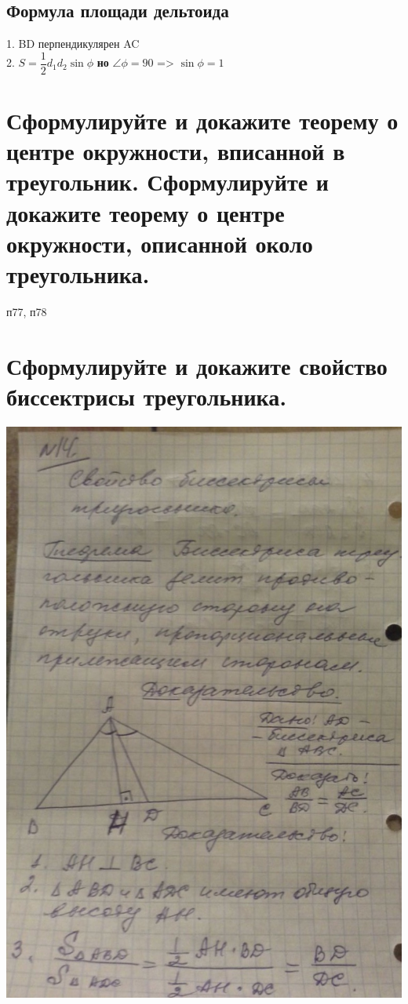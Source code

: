 \documentclass[12pt, letterpaper]{article}
\begin{document}
\subsection{Формула площади дельтоида}
1. BD перпендикулярен AC \\
2. $ S=\dfrac{1}{2} d_1 d_2 \sin{\phi} $ \textbf{но} $\angle \phi = 90$ => $\sin{\phi}=1$ \\


\section {Сформулируйте и докажите теорему о центре окружности, вписанной в треугольник. Сформулируйте и докажите теорему о центре окружности, описанной около треугольника.}
п77, п78
\section {Сформулируйте и докажите свойство биссектрисы треугольника.}
\includegraphics[scale=0.3]{solve14.jpg} \\
\end{document}
